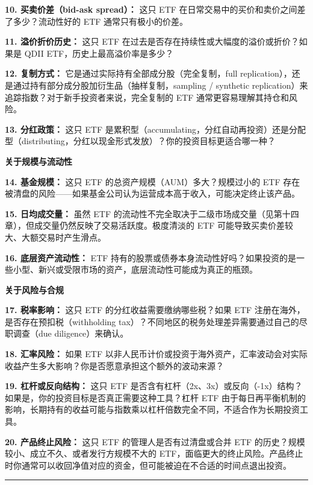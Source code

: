 \documentclass[a4paper,11pt,oneside,fontset=none,UTF8,zihao=-4]{ctexbook}
\begin{document}
\textbf{10. 买卖价差（bid-ask spread）：} 这只 ETF
在日常交易中的买价和卖价之间差了多少？流动性好的 ETF
通常只有极小的价差。

\textbf{11. 溢价折价历史：} 这只 ETF
在过去是否存在持续性或大幅度的溢价或折价？如果是 QDII
ETF，历史上最高溢价率是多少？

\textbf{12. 复制方式：} 它是通过实际持有全部成分股（完全复制，full
replication），还是通过持有部分成分股加衍生品（抽样复制，sampling /
synthetic replication）来追踪指数？对于新手投资者来说，完全复制的 ETF
通常更容易理解其持仓和风险。

\textbf{13. 分红政策：} 这只 ETF
是累积型（accumulating，分红自动再投资）还是分配型（distributing，分红以现金形式发放）？你的投资目标更适合哪一种？

\textbf{关于规模与流动性}

\textbf{14. 基金规模：} 这只 ETF 的总资产规模（AUM）多大？规模过小的 ETF
存在被清盘的风险------如果基金公司认为运营成本高于收入，可能决定终止该产品。

\textbf{15. 日均成交量：} 虽然 ETF
的流动性不完全取决于二级市场成交量（见第十四章），但成交量仍然反映了交易活跃度。极度清淡的
ETF 可能导致买卖价差较大、大额交易时产生滑点。

\textbf{16. 底层资产流动性：} ETF
持有的股票或债券本身流动性好吗？如果投资的是一些小型、新兴或受限市场的资产，底层流动性可能成为真正的瓶颈。

\textbf{关于风险与合规}

\textbf{17. 税率影响：} 这只 ETF 的分红收益需要缴纳哪些税？如果 ETF
注册在海外，是否存在预扣税（withholding
tax）？不同地区的税务处理差异需要通过自己的尽职调查（due
diligence）来确认。

\textbf{18. 汇率风险：} 如果 ETF
以非人民币计价或投资于海外资产，汇率波动会对实际收益产生多大影响？你是否愿意承担这个额外的波动来源？

\textbf{19. 杠杆或反向结构：} 这只 ETF
是否含有杠杆（2x、3x）或反向（-1x）结构？如果是，你的投资目标是否真正需要这种工具？杠杆
ETF
由于每日再平衡机制的影响，长期持有的收益可能与指数乘以杠杆倍数完全不同，不适合作为长期投资工具。

\textbf{20. 产品终止风险：} 这只 ETF 的管理人是否有过清盘或合并 ETF
的历史？规模较小、成立不久、或者发行方规模不大的
ETF，面临更大的终止风险。产品终止时你通常可以收回净值对应的资金，但可能被迫在不合适的时间点退出投资。

\begin{center}{\color{dh-bronze}\rule{0.2\textwidth}{0.5pt}}\end{center}
\end{document}
